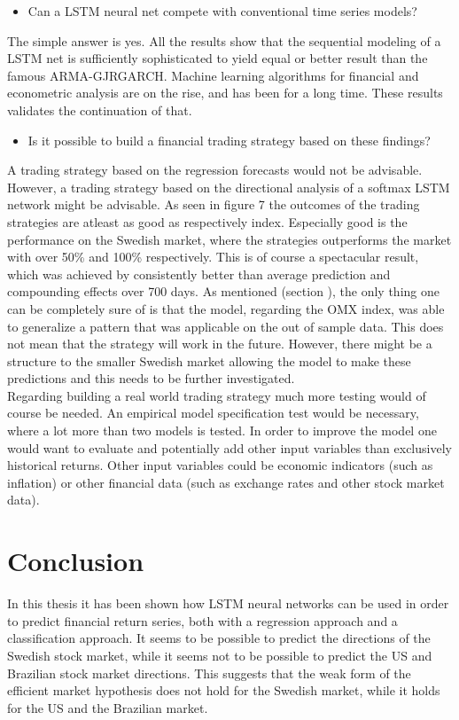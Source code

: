 \documentclass[12pt, letterpaper]{amsart}%
\begin{document}
\begin{itemize}
\item Can a LSTM neural net compete with conventional time series models?
\end{itemize}
The simple answer is yes. All the results show that the sequential modeling of a LSTM net is sufficiently sophisticated to yield equal or better result than the famous ARMA-GJRGARCH. Machine learning algorithms for financial and econometric analysis are on the rise, and has been for a long time. These results validates the continuation of that.
\\

\begin{itemize}
\item Is it possible to build a financial trading strategy based on these findings?
\end{itemize}
A trading strategy based on the regression forecasts would not be advisable. However, a trading strategy based on the directional analysis of a softmax LSTM network might be advisable. As seen in figure 7 the outcomes of the trading strategies are atleast as good as respectively index. Especially good is the performance on the Swedish market, where the strategies outperforms the market with over 50\% and 100\% respectively. This is of course a spectacular result, which was achieved by consistently better than average prediction and compounding effects over 700 days. As mentioned (section ), the only thing one can be completely sure of is that the model, regarding the OMX index, was able to generalize a pattern that was applicable on the out of sample data. This does not mean that the strategy will work in the future. However, there might be a structure to the smaller Swedish market allowing the model to make these predictions and this needs to be further investigated.
\\

Regarding building a real world trading strategy much more testing would of course be needed. An empirical model specification test would be necessary, where a lot more than two models is tested. In order to improve the model one would want to evaluate and potentially add other input variables than exclusively historical returns. Other input variables could be economic indicators (such as inflation) or other financial data (such as exchange rates and other stock market data).

\section{Conclusion}
In this thesis it has been shown how LSTM neural networks can be used in order to predict financial return series, both with a regression approach and a classification approach. It seems to be possible to predict the directions of the Swedish stock market, while it seems not to be possible to predict the US and Brazilian stock market directions. This suggests that the weak form of the efficient market hypothesis does not hold for the Swedish market, while it holds for the US and the Brazilian market.
\end{document}
